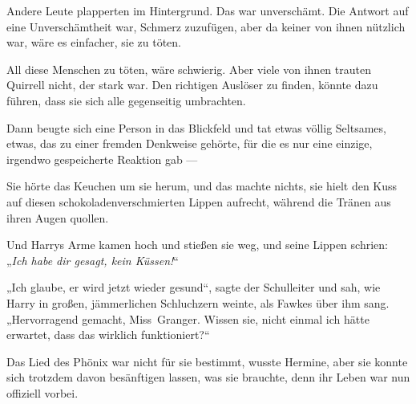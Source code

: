 Andere Leute plapperten im Hintergrund. Das war unverschämt. Die Antwort auf eine Unverschämtheit war, Schmerz zuzufügen, aber da keiner von ihnen nützlich war, wäre es einfacher, sie zu töten.

All diese Menschen zu töten, wäre schwierig. Aber viele von ihnen trauten Quirrell nicht, der stark war. Den richtigen Auslöser zu finden, könnte dazu führen, dass sie sich alle gegenseitig umbrachten.

Dann beugte sich eine Person in das Blickfeld und tat etwas völlig Seltsames, etwas, das zu einer fremden Denkweise gehörte, für die es nur eine einzige, irgendwo gespeicherte Reaktion gab —

\later

Sie hörte das Keuchen um sie herum, und das machte nichts, sie hielt den Kuss auf diesen schokoladenverschmierten Lippen aufrecht, während die Tränen aus ihren Augen quollen.

Und Harrys Arme kamen hoch und stießen sie weg, und seine Lippen schrien:
„\emph{Ich habe dir gesagt, kein Küssen!}“

\later

„Ich glaube, er wird jetzt wieder gesund“, sagte der Schulleiter und sah, wie Harry in großen, jämmerlichen Schluchzern weinte, als Fawkes über ihm sang.
„Hervorragend gemacht, Miss~Granger. Wissen sie, nicht einmal ich hätte erwartet, dass das wirklich funktioniert?“

Das Lied des Phönix war nicht für sie bestimmt, wusste Hermine, aber sie konnte sich trotzdem davon besänftigen lassen, was sie brauchte, denn ihr Leben war nun offiziell vorbei.

